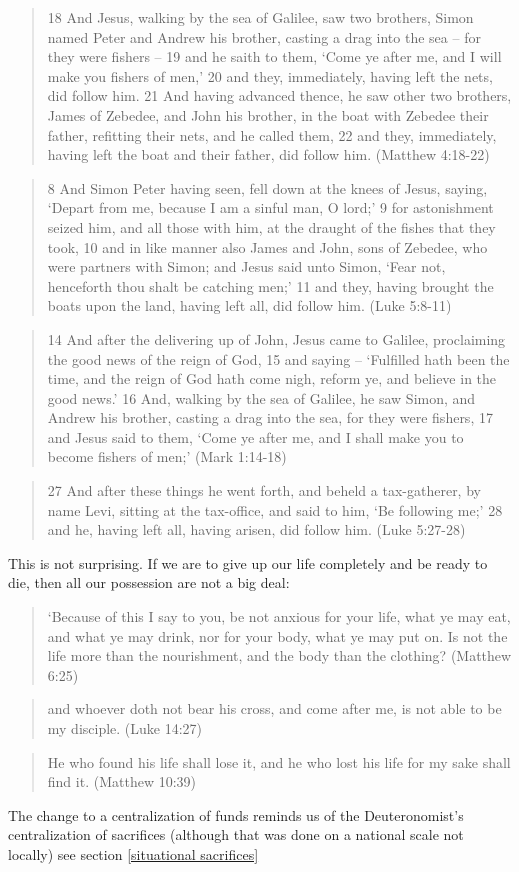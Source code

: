 \documentclass[11pt]{article}
\begin{document}
\begin{quote}
18 And Jesus, walking by the sea of Galilee, saw two brothers, Simon named Peter and Andrew his brother, casting a drag into the sea -- for they were fishers --
19 and he saith to them, `Come ye after me, and I will make you fishers of men,'
20 and they, immediately, having left the nets, did follow him.
21 And having advanced thence, he saw other two brothers, James of Zebedee, and John his brother, in the boat with Zebedee their father, refitting their nets, and he called them,
22 and they, immediately, having left the boat and their father, did follow him.
(Matthew 4:18-22)\end{quote}
 \begin{quote}
8 And Simon Peter having seen, fell down at the knees of Jesus, saying, `Depart from me, because I am a sinful man, O lord;'
9 for astonishment seized him, and all those with him, at the draught of the fishes that they took,
10 and in like manner also James and John, sons of Zebedee, who were partners with Simon; and Jesus said unto Simon, `Fear not, henceforth thou shalt be catching men;'
11 and they, having brought the boats upon the land, having left all, did follow him. (Luke 5:8-11)\end{quote}
\begin{quote}
14 And after the delivering up of John, Jesus came to Galilee, proclaiming the good news of the reign of God,
15 and saying -- `Fulfilled hath been the time, and the reign of God hath come nigh, reform ye, and believe in the good news.'
16 And, walking by the sea of Galilee, he saw Simon, and Andrew his brother, casting a drag into the sea, for they were fishers,
17 and Jesus said to them, `Come ye after me, and I shall make you to become fishers of men;' (Mark 1:14-18)\end{quote}
\begin{quote}
27 And after these things he went forth, and beheld a tax-gatherer, by name Levi, sitting at the tax-office, and said to him, `Be following me;'
28 and he, having left all, having arisen, did follow him.
(Luke 5:27-28)\end{quote}
This is not surprising. If we are to give up our life completely and be ready to die, then all our possession are not a big deal:
\begin{quote}
`Because of this I say to you, be not anxious for your life, what ye may eat, and what ye may drink, nor for your body, what ye may put on. Is not the life more than the nourishment, and the body than the clothing? (Matthew 6:25)
\end{quote}
\begin{quote}
and whoever doth not bear his cross, and come after me, is not able to be my disciple. (Luke 14:27)
\end{quote}
\begin{quote}
He who found his life shall lose it, and he who lost his life for my sake shall find it. (Matthew 10:39) \end{quote}
The change to a centralization of funds reminds us of the Deuteronomist's centralization of sacrifices (although that was done on a national scale not locally) see section \ref{situational sacrifices} 
\end{document}
